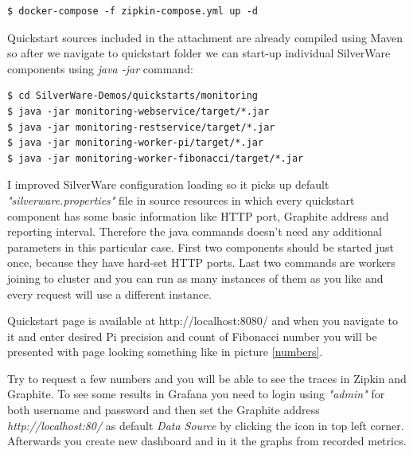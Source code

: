 \documentclass[12pt,oneside]{fithesis2}
\begin{document}
\begin{verbatim}
$ docker-compose -f zipkin-compose.yml up -d
\end{verbatim}
\bigskip
Quickstart sources included in the attachment are already compiled using Maven so after we navigate to quickstart folder we can start-up individual SilverWare components using \textit{java -jar} command:\newline

\begin{verbatim}
$ cd SilverWare-Demos/quickstarts/monitoring
$ java -jar monitoring-webservice/target/*.jar
$ java -jar monitoring-restservice/target/*.jar
$ java -jar monitoring-worker-pi/target/*.jar
$ java -jar monitoring-worker-fibonacci/target/*.jar
\end{verbatim}
\bigskip
I improved SilverWare configuration loading so it picks up default \textit{"silverware.properties"} file in source resources in which every quickstart component has some basic information like HTTP port, Graphite address and reporting interval. Therefore the java commands doesn't need any additional parameters in this particular case. First two components should be started just once, because they have hard-set HTTP ports. Last two commands are workers joining to cluster and you can run as many instances of them as you like and every request will use a different instance.

Quickstart page is available at http://localhost:8080/ and when you navigate to it and enter desired Pi precision and count of Fibonacci number you will be presented with page looking something like in picture \ref{numbers}.

Try to request a few numbers and you will be able to see the traces in Zipkin and Graphite. To see some results in Grafana you need to login using \textit{"admin"} for both username and password and then set the Graphite address \textit{http://localhost:80/} as default \textit{Data Source} by clicking the icon in top left corner. Afterwards you create new dashboard and in it the graphs from recorded metrics.
\end{document}
